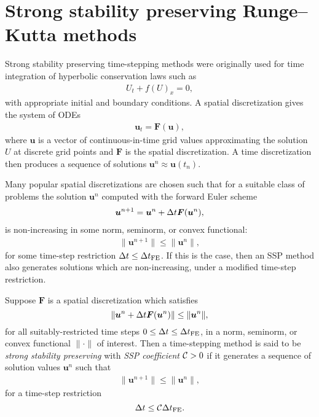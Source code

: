 \section{Strong stability preserving Runge--Kutta methods}
\label{sec:SSP}

Strong stability preserving time-stepping methods were originally used
for time integration of hyperbolic conservation laws
\cite{Shu/Osher:1988} such as
\begin{align*}
    U_t + f(U)_x = 0,   %
\end{align*}
with appropriate initial and boundary conditions.
A spatial discretization gives the system of ODEs
\begin{align*}
    \bm{u}_{t} = \bm{F}(\bm{u}),
\end{align*}
where $\bm{u}$ is a vector of continuous-in-time grid values
approximating the solution $U$ at discrete grid points and $\bm{F}$ is
the spatial discretization. %
A time discretization then produces a sequence of solutions
$\bm{u}^{n} \approx \bm{u}(t_n)$.

Many popular spatial discretizations are chosen such that for a
suitable class of problems the solution $\bm{u}^{n}$ computed with the
forward Euler scheme
\begin{align}\label{eq:forwardEuler}
    \bm{u}^{n+1} = \bm{u}^{n} + \Delta t\bm{F}(\bm{u}^{n}),
\end{align}
is non-increasing in some norm, seminorm, or convex functional:
\begin{align*}
    \|\bm{u}^{n+1}\| \le \|\bm{u}^n\|,
\end{align*}
for some time-step restriction $\Delta t \leq \Delta t_{\text{FE}}$.
If this is the case, then an SSP method also generates solutions which are non-increasing, under a modified time-step restriction.
\begin{definition}
Suppose $\bm{F}$ is a spatial discretization which satisfies
$$\|\bm{u}^{n} + \Delta t\bm{F}(\bm{u}^{n})\| \le \|\bm{u}^n\|,$$
for all suitably-restricted time steps
$0 \le \Delta t \le \Delta t_{\text{FE}}$,
in a norm, seminorm, or convex functional $\|\cdot\|$ of interest.
Then a time-stepping method is said to be \emph{strong stability
  preserving} with \emph{SSP coefficient} $\mathcal{C} > 0$ if it
generates a sequence of solution values $\bm{u}^n$ such that
\begin{align*}
  \|\bm{u}^{n+1}\| \le \|\bm{u}^n\|,
\end{align*}
for a time-step restriction
$$\Delta t \leq \mathcal{C} \Delta t_{\text{FE}}.$$
\end{definition}


